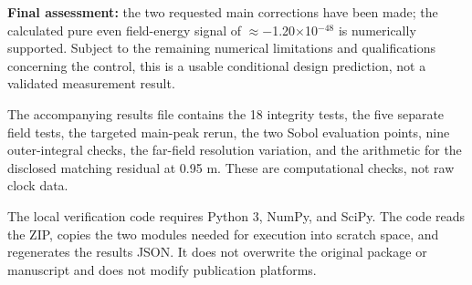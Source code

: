 \documentclass[10pt,a4paper]{article}
\begin{document}
{\textbf{Final assessment:} the two requested main corrections have been made; the calculated pure even field-energy signal of $\approx$$-$1.20$\times$10$^{-48}$ is numerically supported. Subject to the remaining numerical limitations and qualifications concerning the control, this is a usable conditional design prediction, not a validated measurement result.
\par
\vspace{2pt}\par\vspace{0.5pt}
\par
The accompanying results file contains the 18 integrity tests, the five separate field tests, the targeted main-peak rerun, the two Sobol evaluation points, nine outer-integral checks, the far-field resolution variation, and the arithmetic for the disclosed matching residual at 0.95 m. These are computational checks, not raw clock data.
\par
The local verification code requires Python 3, NumPy, and SciPy. The code reads the ZIP, copies the two modules needed for execution into scratch space, and regenerates the results JSON. It does not overwrite the original package or manuscript and does not modify publication platforms.
}
\end{document}
